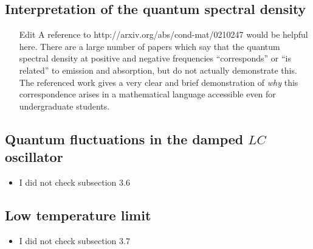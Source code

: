 \subsection{Interpretation of the quantum spectral density}

\begin{itemize}

\item[Edit] A reference to http://arxiv.org/abs/cond-mat/0210247 would be helpful here. There are a large number of papers which say that the quantum spectral density at positive and negative frequencies ``corresponds'' or ``is related'' to emission and absorption, but do not actually demonstrate this. The referenced work gives a very clear and brief demonstration of \emph{why} this correspondence arises in a mathematical language accessible even for undergraduate students.

\end{itemize}

\subsection{Quantum fluctuations in the damped $LC$ oscillator}

\begin{itemize}

\item I did not check subsection 3.6

\end{itemize}

\subsection{Low temperature limit}

\begin{itemize}

\item I did not check subsection 3.7

\end{itemize}

